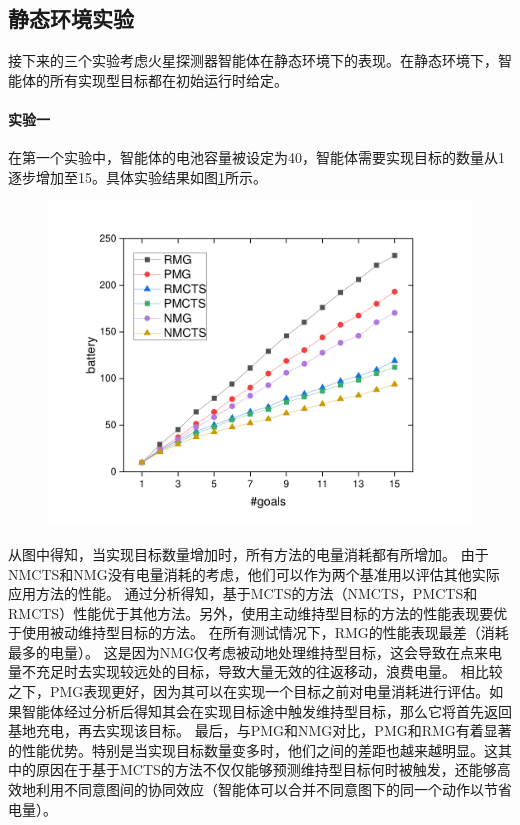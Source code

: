 \subsection{静态环境实验}
接下来的三个实验考虑火星探测器智能体在静态环境下的表现。在静态环境下，智能体的所有实现型目标都在初始运行时给定。
\paragraph{实验一}
在第一个实验中，智能体的电池容量被设定为40，智能体需要实现目标的数量从1逐步增加至15。具体实验结果如图\ref{fig:static1}所示。
\begin{figure}[!h]
\centering
\includegraphics[scale=0.4]{./figs/gX_cY_fixCap40.pdf}
\captionsetup{justification=centering}
\label{fig:static1}
\end{figure}

从图中得知，当实现目标数量增加时，所有方法的电量消耗都有所增加。
由于NMCTS和NMG没有电量消耗的考虑，他们可以作为两个基准用以评估其他实际应用方法的性能。
通过分析得知，基于MCTS的方法（NMCTS，PMCTS和RMCTS）性能优于其他方法。另外，使用主动维持型目标的方法的性能表现要优于使用被动维持型目标的方法。
在所有测试情况下，RMG的性能表现最差（消耗最多的电量）。
这是因为NMG仅考虑被动地处理维持型目标，这会导致在点来电量不充足时去实现较远处的目标，导致大量无效的往返移动，浪费电量。
相比较之下，PMG表现更好，因为其可以在实现一个目标之前对电量消耗进行评估。如果智能体经过分析后得知其会在实现目标途中触发维持型目标，那么它将首先返回基地充电，再去实现该目标。
最后，与PMG和NMG对比，PMG和RMG有着显著的性能优势。特别是当实现目标数量变多时，他们之间的差距也越来越明显。这其中的原因在于基于MCTS的方法不仅仅能够预测维持型目标何时被触发，还能够高效地利用不同意图间的协同效应（智能体可以合并不同意图下的同一个动作以节省电量）。


